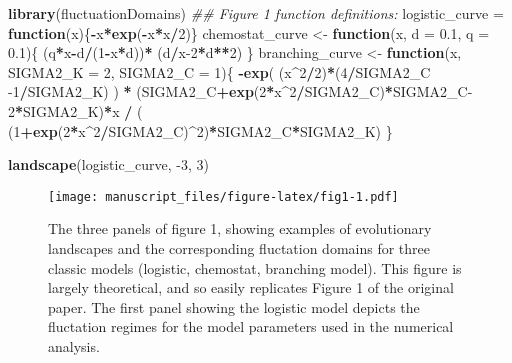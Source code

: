 \documentclass[
]{rescience}
\newenvironment{Shaded}{\begin{snugshade}}{\end{snugshade}}
\newcommand{\CommentTok}[1]{\textcolor[rgb]{0.56,0.35,0.01}{\textit{#1}}}
\newcommand{\ControlFlowTok}[1]{\textcolor[rgb]{0.13,0.29,0.53}{\textbf{#1}}}
\newcommand{\DataTypeTok}[1]{\textcolor[rgb]{0.13,0.29,0.53}{#1}}
\newcommand{\DecValTok}[1]{\textcolor[rgb]{0.00,0.00,0.81}{#1}}
\newcommand{\FloatTok}[1]{\textcolor[rgb]{0.00,0.00,0.81}{#1}}
\newcommand{\KeywordTok}[1]{\textcolor[rgb]{0.13,0.29,0.53}{\textbf{#1}}}
\newcommand{\NormalTok}[1]{#1}
\newcommand{\OperatorTok}[1]{\textcolor[rgb]{0.81,0.36,0.00}{\textbf{#1}}}
\newcommand{\StringTok}[1]{\textcolor[rgb]{0.31,0.60,0.02}{#1}}
\begin{document}
\begin{Shaded}
\begin{Highlighting}[]
\KeywordTok{library}\NormalTok{(fluctuationDomains)}
\CommentTok{## Figure 1 function definitions:}
\NormalTok{logistic_curve =}\StringTok{ }\ControlFlowTok{function}\NormalTok{(x)\{}\OperatorTok{-}\NormalTok{x}\OperatorTok{*}\KeywordTok{exp}\NormalTok{(}\OperatorTok{-}\NormalTok{x}\OperatorTok{*}\NormalTok{x}\OperatorTok{/}\DecValTok{2}\NormalTok{)\}}
\NormalTok{chemostat_curve <-}\StringTok{ }\ControlFlowTok{function}\NormalTok{(x, }\DataTypeTok{d =} \FloatTok{0.1}\NormalTok{, }\DataTypeTok{q =} \FloatTok{0.1}\NormalTok{)\{}
\NormalTok{  (q}\OperatorTok{*}\NormalTok{x}\OperatorTok{-}\NormalTok{d}\OperatorTok{/}\NormalTok{(}\DecValTok{1}\OperatorTok{-}\NormalTok{x}\OperatorTok{*}\NormalTok{d))}\OperatorTok{*}\StringTok{ }\NormalTok{(d}\OperatorTok{/}\NormalTok{x}\DecValTok{-2}\OperatorTok{*}\NormalTok{d}\OperatorTok{**}\DecValTok{2}\NormalTok{)}
\NormalTok{\}}
\NormalTok{branching_curve <-}\StringTok{ }\ControlFlowTok{function}\NormalTok{(x, }\DataTypeTok{SIGMA2_K =} \DecValTok{2}\NormalTok{, }\DataTypeTok{SIGMA2_C =} \DecValTok{1}\NormalTok{)\{}
  \OperatorTok{-}\KeywordTok{exp}\NormalTok{( (x}\OperatorTok{^}\DecValTok{2}\OperatorTok{/}\DecValTok{2}\NormalTok{)}\OperatorTok{*}\NormalTok{(}\DecValTok{4}\OperatorTok{/}\NormalTok{SIGMA2_C }\DecValTok{-1}\OperatorTok{/}\NormalTok{SIGMA2_K) ) }\OperatorTok{*}
\StringTok{    }\NormalTok{(SIGMA2_C}\OperatorTok{+}\KeywordTok{exp}\NormalTok{(}\DecValTok{2}\OperatorTok{*}\NormalTok{x}\OperatorTok{^}\DecValTok{2}\OperatorTok{/}\NormalTok{SIGMA2_C)}\OperatorTok{*}\NormalTok{SIGMA2_C}\DecValTok{-2}\OperatorTok{*}\NormalTok{SIGMA2_K)}\OperatorTok{*}\NormalTok{x }\OperatorTok{/}
\StringTok{    }\NormalTok{( (}\DecValTok{1}\OperatorTok{+}\KeywordTok{exp}\NormalTok{(}\DecValTok{2}\OperatorTok{*}\NormalTok{x}\OperatorTok{^}\DecValTok{2}\OperatorTok{/}\NormalTok{SIGMA2_C)}\OperatorTok{^}\DecValTok{2}\NormalTok{)}\OperatorTok{*}\NormalTok{SIGMA2_C}\OperatorTok{*}\NormalTok{SIGMA2_K)}
\NormalTok{\}}

\KeywordTok{landscape}\NormalTok{(logistic_curve, }\DecValTok{-3}\NormalTok{, }\DecValTok{3}\NormalTok{)}
\end{Highlighting}
\end{Shaded}

\begin{figure}
\centering
\texttt{[image: manuscript\_files/figure-latex/fig1-1.pdf]}
\caption{The three panels of figure 1, showing examples of evolutionary
landscapes and the corresponding fluctation domains for three classic
models (logistic, chemostat, branching model). This figure is largely
theoretical, and so easily replicates Figure 1 of the original paper.
The first panel showing the logistic model depicts the fluctation
regimes for the model parameters used in the numerical analysis.}
\end{figure}
\end{document}
